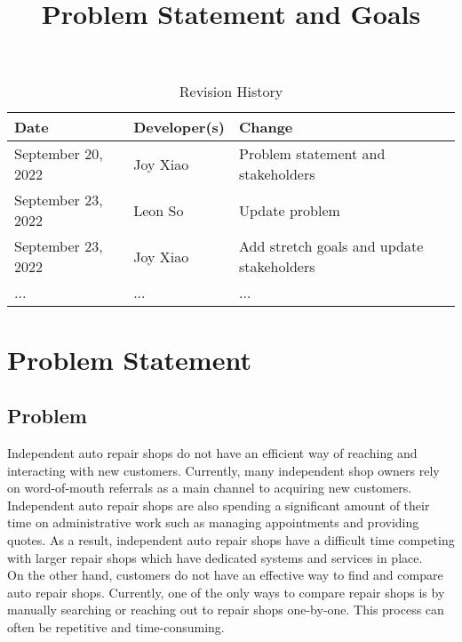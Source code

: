 \documentclass{article}
\title{Problem Statement and Goals\\\progname}
\author{\authname}
\date{}
\begin{document}
\maketitle

\begin{table}[hp]
\caption{Revision History} \label{TblRevisionHistory}
\begin{tabularx}{\textwidth}{llX}
\toprule
\textbf{Date} & \textbf{Developer(s)} & \textbf{Change}\\
\midrule
September 20, 2022 & Joy Xiao & Problem statement and stakeholders\\
September 23, 2022 & Leon So & Update problem\\
September 23, 2022 & Joy Xiao & Add stretch goals and update stakeholders\\
... & ... & ...\\
\bottomrule
\end{tabularx}
\end{table}

\section{Problem Statement}


\subsection{Problem}
Independent auto repair shops do not have an efficient way of reaching and interacting with new customers.
Currently, many independent shop owners rely on word-of-mouth referrals as a main channel to acquiring new customers. 
Independent auto repair shops are also spending a significant amount of their time on administrative work such as 
managing appointments and providing quotes. As a result, independent auto repair shops have a difficult time 
competing with larger repair shops which have dedicated systems and services in place.\\

On the other hand, customers do not have an effective way to find and compare auto repair shops. 
Currently, one of the only ways to compare repair shops is by manually searching or reaching out to repair shops one-by-one. 
This process can often be repetitive and time-consuming.
\end{document}
